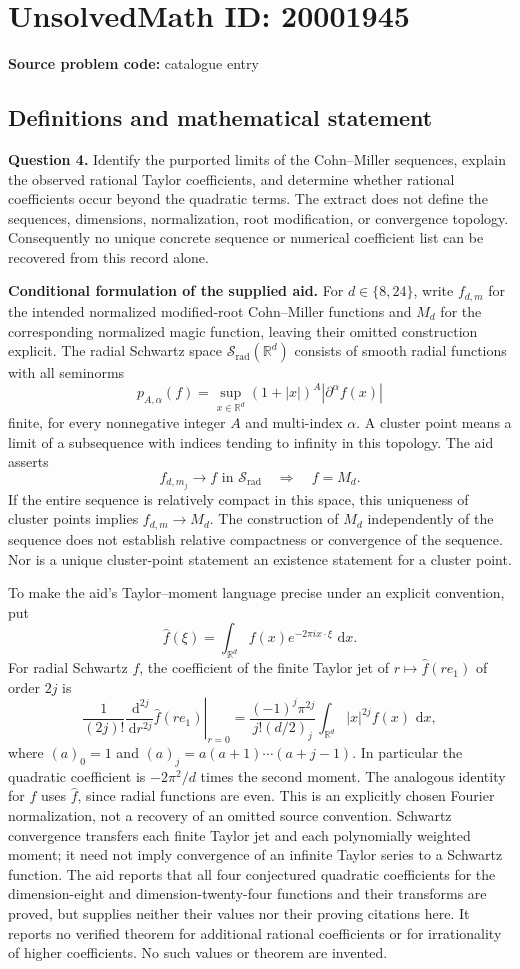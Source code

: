 \documentclass[11pt]{article}
\newcommand{\R}{\mathbb{R}}
\newcommand{\dd}{\,\mathrm{d}}
\begin{document}
\section*{UnsolvedMath ID: 20001945}
\textbf{Source problem code:} catalogue entry
\subsection{Definitions and mathematical statement}
\textbf{Question 4.} Identify the purported limits of the Cohn--Miller sequences, explain the observed rational Taylor coefficients, and determine whether rational coefficients occur beyond the quadratic terms. The extract does not define the sequences, dimensions, normalization, root modification, or convergence topology. Consequently no unique concrete sequence or numerical coefficient list can be recovered from this record alone.

\textbf{Conditional formulation of the supplied aid.} For $d\in\{8,24\}$, write $f_{d,m}$ for the intended normalized modified-root Cohn--Miller functions and $M_d$ for the corresponding normalized magic function, leaving their omitted construction explicit. The radial Schwartz space $\mathcal S_{\mathrm{rad}}(\R^d)$ consists of smooth radial functions with all seminorms
\[
 p_{A,\alpha}(f)=\sup_{x\in\R^d}(1+|x|)^A|\partial^\alpha f(x)|
\]
finite, for every nonnegative integer $A$ and multi-index $\alpha$. A cluster point means a limit of a subsequence with indices tending to infinity in this topology. The aid asserts
\[
 f_{d,m_j}\longrightarrow f\text{ in }\mathcal S_{\mathrm{rad}}
 \quad\Longrightarrow\quad f=M_d.
\]
If the entire sequence is relatively compact in this space, this uniqueness of cluster points implies $f_{d,m}\to M_d$. The construction of $M_d$ independently of the sequence does not establish relative compactness or convergence of the sequence. Nor is a unique cluster-point statement an existence statement for a cluster point.

To make the aid's Taylor--moment language precise under an explicit convention, put
\[
 \widehat f(\xi)=\int_{\R^d}f(x)e^{-2\pi i x\cdot\xi}\,\dd x.
\]
For radial Schwartz $f$, the coefficient of the finite Taylor jet of $r\mapsto\widehat f(re_1)$ of order $2j$ is
\[
 \frac1{(2j)!}\left.\frac{\dd^{2j}}{\dd r^{2j}}
        \widehat f(re_1)\right|_{r=0}
 =\frac{(-1)^j\pi^{2j}}{j!(d/2)_j}
       \int_{\R^d}|x|^{2j}f(x)\,\dd x,
\]
where $(a)_0=1$ and $(a)_j=a(a+1)\cdots(a+j-1)$. In particular the quadratic coefficient is $-2\pi^2/d$ times the second moment. The analogous identity for $f$ uses $\widehat f$, since radial functions are even. This is an explicitly chosen Fourier normalization, not a recovery of an omitted source convention. Schwartz convergence transfers each finite Taylor jet and each polynomially weighted moment; it need not imply convergence of an infinite Taylor series to a Schwartz function. The aid reports that all four conjectured quadratic coefficients for the dimension-eight and dimension-twenty-four functions and their transforms are proved, but supplies neither their values nor their proving citations here. It reports no verified theorem for additional rational coefficients or for irrationality of higher coefficients. No such values or theorem are invented.
\end{document}
